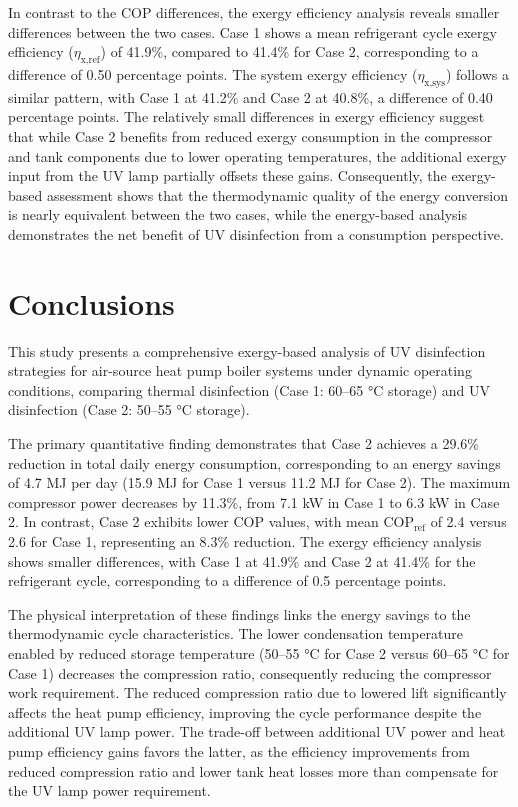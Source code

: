 \documentclass[letterpaper,10pt]{article}
\begin{document}
In contrast to the COP differences, the exergy efficiency analysis reveals smaller differences between the two cases. Case 1 shows a mean refrigerant cycle exergy efficiency ($\eta_{\text{x,ref}}$) of 41.9\%, compared to 41.4\% for Case 2, corresponding to a difference of 0.50 percentage points. The system exergy efficiency ($\eta_{\text{x,sys}}$) follows a similar pattern, with Case 1 at 41.2\% and Case 2 at 40.8\%, a difference of 0.40 percentage points. The relatively small differences in exergy efficiency suggest that while Case 2 benefits from reduced exergy consumption in the compressor and tank components due to lower operating temperatures, the additional exergy input from the UV lamp partially offsets these gains. Consequently, the exergy-based assessment shows that the thermodynamic quality of the energy conversion is nearly equivalent between the two cases, while the energy-based analysis demonstrates the net benefit of UV disinfection from a consumption perspective.

\section{Conclusions}

This study presents a comprehensive exergy-based analysis of UV disinfection strategies for air-source heat pump boiler systems under dynamic operating conditions, comparing thermal disinfection (Case 1: 60--65 °C storage) and UV disinfection (Case 2: 50--55 °C storage).

The primary quantitative finding demonstrates that Case 2 achieves a 29.6\% reduction in total daily energy consumption, corresponding to an energy savings of 4.7 MJ per day (15.9 MJ for Case 1 versus 11.2 MJ for Case 2). The maximum compressor power decreases by 11.3\%, from 7.1 kW in Case 1 to 6.3 kW in Case 2. In contrast, Case 2 exhibits lower COP values, with mean $\text{COP}_{\text{ref}}$ of 2.4 versus 2.6 for Case 1, representing an 8.3\% reduction. The exergy efficiency analysis shows smaller differences, with Case 1 at 41.9\% and Case 2 at 41.4\% for the refrigerant cycle, corresponding to a difference of 0.5 percentage points.

The physical interpretation of these findings links the energy savings to the thermodynamic cycle characteristics. The lower condensation temperature enabled by reduced storage temperature (50--55 °C for Case 2 versus 60--65 °C for Case 1) decreases the compression ratio, consequently reducing the compressor work requirement. The reduced compression ratio due to lowered lift significantly affects the heat pump efficiency, improving the cycle performance despite the additional UV lamp power. The trade-off between additional UV power and heat pump efficiency gains favors the latter, as the efficiency improvements from reduced compression ratio and lower tank heat losses more than compensate for the UV lamp power requirement.
\end{document}
